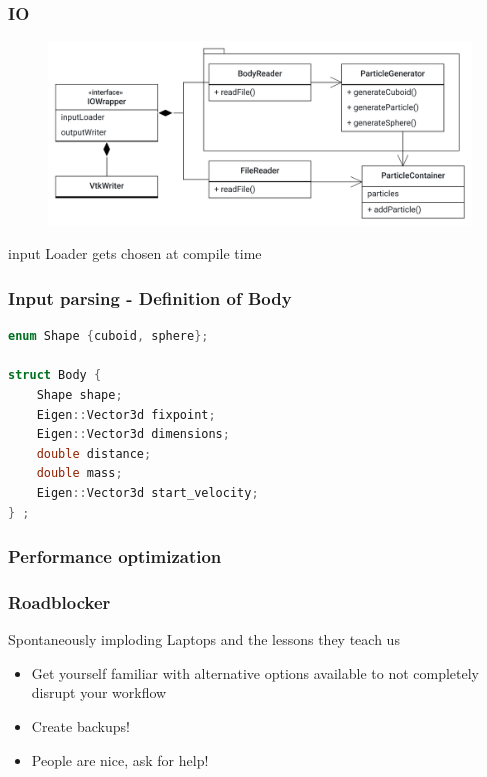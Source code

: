 \begin{frame}
	\frametitle{IO}
	\begin{figure}
		\centering
		\includegraphics[width=0.7\linewidth]{IOWrapper}
		\label{fig:iowrapper}
	\end{figure}
	\large
	\centering
	input Loader gets chosen at compile time
\end{frame}


\begin{frame}[fragile]
\frametitle{Input parsing - Definition of Body}
\vspace{0.7cm}

\begin{lstlisting}[language=C++]
enum Shape {cuboid, sphere};

struct Body {
	Shape shape;   
	Eigen::Vector3d fixpoint; 
	Eigen::Vector3d dimensions; 
	double distance;
	double mass;
	Eigen::Vector3d start_velocity;
} ;
\end{lstlisting}
\end{frame}

\begin{frame}
	\frametitle{Performance optimization}
\end{frame}

\begin{frame}
	\frametitle{Roadblocker}
	\Large
	Spontaneously imploding Laptops and the lessons they teach us
	\large
	\begin{itemize}
		\item<1-> Get yourself familiar with alternative options available to not completely disrupt your workflow
		\item<2-> Create backups!
		\item<3-> People are nice, ask for help!
	\end{itemize}
	
\end{frame}

